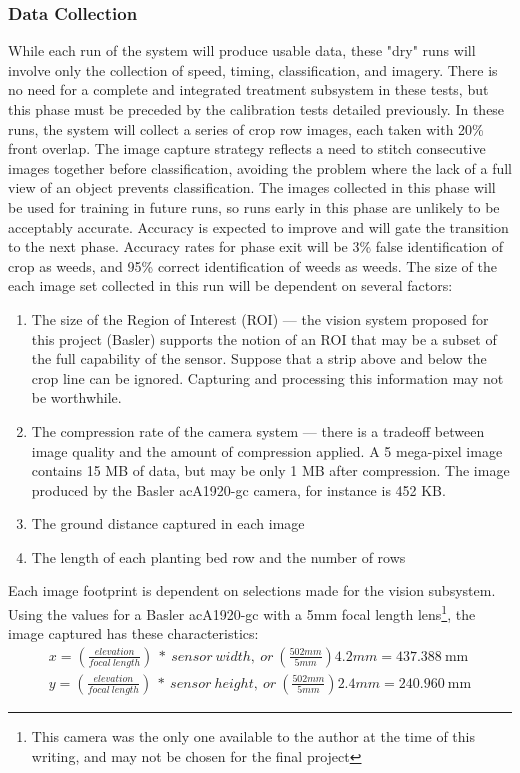\documentclass[12pt]{article}
\begin{document}
\subsubsection{Data Collection}
While each run of the system will produce usable data, these "dry" runs will involve only the collection of speed, timing, classification, and imagery. There is no need for a complete and integrated treatment subsystem in these tests, but this phase must be preceded by the calibration tests detailed previously.
 In these runs, the system will collect a series of crop row images, each taken with 20\% front overlap. The image capture strategy reflects a need to stitch consecutive images together before classification, avoiding the problem where the lack of a full view of an object prevents classification. The images collected in this phase will be used for training in future runs, so runs early in this phase are unlikely to be acceptably accurate. Accuracy is expected to improve and will gate the transition to the next phase. Accuracy rates for phase exit will be 3\% false identification of crop as weeds, and 95\% correct identification of weeds as weeds.
The size of the each image set collected in this run will be dependent on several factors:
\begin{enumerate}
	\item{The size of the Region of Interest (ROI) --- the vision system proposed for this project (Basler) supports the notion of an ROI that may be a subset of the full capability of the sensor. Suppose that a strip above and below the crop line can be ignored. Capturing and processing this information may not be worthwhile.}
	\item{The compression rate of the camera system --- there is a tradeoff between image quality and the amount of compression applied. A 5 mega-pixel image contains 15 MB of data, but may be only 1 MB after compression. The image produced by the Basler acA1920-gc camera, for instance is 452 KB.}
	\item{The ground distance captured in each image}
	\item{The length of each planting bed row and the number of rows}
\end{enumerate}
Each image footprint is dependent on selections made for the vision subsystem. Using the values for a Basler acA1920-gc with a 5mm focal length lens\footnote{This camera was the only one available to the author at the time of this writing, and may not be chosen for the final project}, the image captured has these characteristics:
\begin{align}
	x = \left( \frac {elevation} {focal\ length} \right) \ *\ sensor\ width,\ or\ \left( \frac {502mm} {5mm} \right) 4.2mm = \SI{437.388}{\milli\meter} \\
	y = \left( \frac {elevation} {focal\ length} \right) \ *\ sensor\ height,\ or\ \left( \frac {502mm} {5mm} \right) 2.4mm = \SI{240.960}{\milli\meter}
\end{align}
\end{document}
